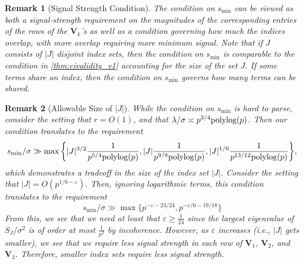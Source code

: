 \documentclass[10pt]{article}
\newcommand{\0}{{\mathbf{0}}}
\newcommand{\1}{{\mathbf{1}}}
\newcommand{\polylog}{{\rm polylog}}
\newtheorem{remark}{Remark}
\newcommand{\eps}{\varepsilon}
\renewcommand{\hat}{\widehat}
\renewcommand{\hat}{\widehat}
\newcommand{\red}{\color{red}}
\begin{document}
\begin{remark}[Signal Strength Condition]
The condition on $s_{\min}$ can be viewed as both a signal-strength requirement on the magnitudes of the corresponding entries of the rows of the $\mathbf{V}_k$'s as well as a condition governing how much the indices overlap, with more overlap requiring more minimum signal.  Note that if $J$ consists of $|J|$ disjoint index sets, then the condition on $s_{\min}$ is comparable to the condition in \cref{thm:civalidity_v1} accounting for the size of the set $J$.   If some terms share an index, then the condition on $s_{\min}$ governs how many terms can be shared.  
\end{remark}


 \begin{remark}[Allowable Size of $|J|$]
 While the condition on $s_{\min}$ is hard to parse, consider the setting that $r = O(1)$, and that $\lambda/\sigma \asymp p^{3/4} \polylog(p)$.  Then our condition translates to the requirement
\begin{align*}
   s_{\min}/\sigma \gg \max\bigg\{  |J|^{3/2} \frac{1}{ p^{5/4} \polylog(p) }, |J| \frac{ 1}{p^{9/8} \polylog(p)},   |J|^{1/6} \frac{1}{p^{13/12}\polylog(p)}\bigg\},
\end{align*}
which demonstrates a tradeoff in the size of the index set $|J|$.  Consider the setting that $|J| = O(p^{1/6 - \eps})$.  Then, ignoring logarithmic terms, this condition translates to the requirement %
$$s_{\min}/\sigma
     \gg \max\bigg\{ p^{-\eps-23/24} , p^{-\eps/6-19/18}\bigg\}$$%
From this, we see that we need at least that $\eps \geq \frac{1}{24}$ since the largest eigenvalue of $S_J/\sigma^2$ is of order at most $\frac{1}{p^2}$ by incoherence.  
However, as $\eps$ increases (i.e., $|J|$ gets smaller), we see that we require less signal strength in each row of $\mathbf{V}_1$, $\mathbf{V}_2$, and $\mathbf{V}_3$.  Therefore, smaller index sets require less signal strength.
 \end{remark}




  




\end{document}
